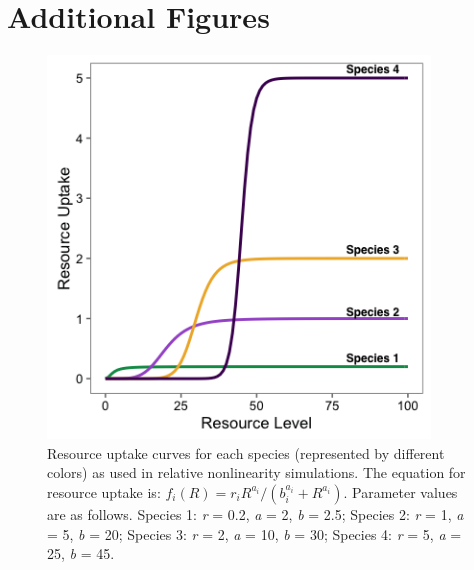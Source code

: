 \documentclass[11pt,]{article}
\begin{document}
\newpage{}

\section{Additional Figures}

\begin{figure}[!ht]
  \centering
      \includegraphics[width=4in]{./components/fourspp_Ruptake_relnonlin.png}
  \caption{Resource uptake curves for each species (represented by different colors) as used in relative nonlinearity simulations. The equation for resource uptake is: $f_{i}(R) = r_{i}R^{a_{i}} / (b_{i}^{a_{i}}+R^{a_{i}})$. Parameter values are as follows. Species 1: \emph{r} = 0.2, \emph{a} = 2, \emph{b} = 2.5; Species 2: \emph{r} = 1, \emph{a} = 5, \emph{b} = 20; Species 3: \emph{r} = 2, \emph{a} = 10, \emph{b} = 30; Species 4: \emph{r} = 5, \emph{a} = 25, \emph{b} = 45.}
\end{figure}

\newpage{}
\end{document}
